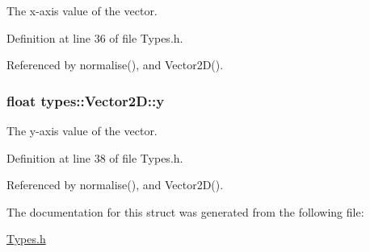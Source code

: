 The x-\/axis value of the vector. 



Definition at line 36 of file Types.\+h.



Referenced by normalise(), and Vector2\+D().

\hypertarget{structtypes_1_1_vector2_d_af91db0a84d6cc1645b0b4fc79aca835f}{}
\subsubsection[{y}]{\setlength{\rightskip}{0pt plus 5cm}float types\+::\+Vector2\+D\+::y}\label{structtypes_1_1_vector2_d_af91db0a84d6cc1645b0b4fc79aca835f}


The y-\/axis value of the vector. 



Definition at line 38 of file Types.\+h.



Referenced by normalise(), and Vector2\+D().



The documentation for this struct was generated from the following file\+:\begin{DoxyCompactItemize}
\item 
\hyperlink{_types_8h}{Types.\+h}\end{DoxyCompactItemize}
